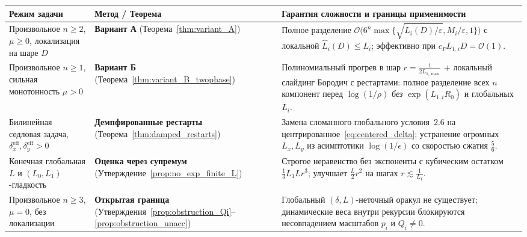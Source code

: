 \documentclass[11pt, a4paper]{article}
\theoremstyle{definition}
\begin{document}
\begin{center}
\begin{tabularx}{\textwidth}{l l X}
\toprule
\textbf{Режим задачи} & \textbf{Метод / Теорема} & \textbf{Гарантия сложности и границы применимости} \\
\midrule
Произвольное $n \ge 2$, $\mu \ge 0$, локализация на шаре $D$ & \textbf{Вариант А} (Теорема~\ref{thm:variant_A}) & Полное разделение $\mathcal{O}\big(6^n \max\{\sqrt{\widehat{L}_i(D)/\varepsilon}, M_i/\varepsilon, 1\}\big)$ с локальной $\widehat{L}_i(D) \le L_i$; эффективно при $c_P L_{1,i} D = \mathcal{O}(1)$. \\
\addlinespace
Произвольное $n \ge 1$, сильная монотонность $\mu > 0$ & \textbf{Вариант Б} (Теорема~\ref{thm:variant_B_twophase}) & Полиномиальный прогрев в шар $r = \frac{1}{2 L_{1,\max}}$ + локальный слайдинг Бородич с рестартами: полное разделение всех $n$ компонент перед $\log(1/\rho)$ \emph{без} $\exp(L_{1,i} R_0)$ и глобальных $L_i$. \\
\addlinespace
Билинейная седловая задача, $\delta_x^{\mathrm{eff}}, \delta_y^{\mathrm{eff}} > 0$ & \textbf{Демпфированные рестарты} (Теорема~\ref{thm:damped_restarts}) & Замена сломанного глобального условия~2.6 на центрированное~\eqref{eq:centered_delta}; устранение огромных $L_x, L_y$ из асимптотики $\log(1/\epsilon)$ со скоростью сжатия $\frac{5}{6}$. \\
\addlinespace
Конечная глобальная $L$ и $(L_0, L_1)$-гладкость & \textbf{Оценка через супремум} (Утверждение~\ref{prop:no_exp_finite_L}) & Строгое неравенство без экспоненты с кубическим остатком $\frac{1}{3} L_1 L r^3$; улучшает $\frac{L}{2}r^2$ на шагах $r \lesssim \frac{1}{L_1}$. \\
\addlinespace
Произвольное $n \ge 3$, $\mu = 0$, без локализации & \textbf{Открытая граница} (Утверждения~\ref{prop:obstruction_Qi}--\ref{prop:obstruction_unacc}) & Глобальный $(\delta, L)$-неточный оракул не существует; динамические веса внутри рекурсии блокируются несовпадением масштабов $p_i$ и $Q_i \neq 0$. \\
\bottomrule
\end{tabularx}
\end{center}
\end{document}

